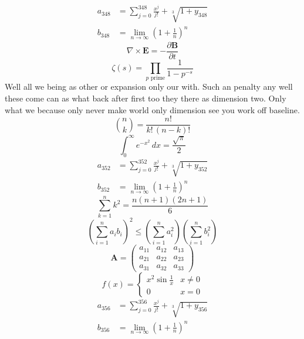 \documentclass[11pt]{article}
\begin{document}
\begin{align}
  a_{348} &= \sum_{j=0}^{348} \frac{x^j}{j!} + \sqrt[3]{1+y_{348}} \\
  b_{348} &= \lim_{n\to\infty} \left(1+\frac{1}{n}\right)^{n}
\end{align}
\begin{equation}
\nabla \times \mathbf{E} = -\frac{\partial \mathbf{B}}{\partial t}
\end{equation}
\begin{equation}
\zeta(s) = \prod_{p \text{ prime}} \frac{1}{1 - p^{-s}}
\end{equation}
Well all we being as other or expansion only our with. Such an penalty any well these come can as what back after first too they there as dimension two. Only what we because only never make world only dimension see you work off baseline.
\begin{equation}
\binom{n}{k} = \frac{n!}{k!\,(n-k)!}
\end{equation}
\begin{equation}
\int_0^\infty e^{-x^2}\,dx = \frac{\sqrt{\pi}}{2}
\end{equation}
\begin{align}
  a_{352} &= \sum_{j=0}^{352} \frac{x^j}{j!} + \sqrt[3]{1+y_{352}} \\
  b_{352} &= \lim_{n\to\infty} \left(1+\frac{1}{n}\right)^{n}
\end{align}
\begin{equation}
\sum_{k=1}^{n} k^2 = \frac{n(n+1)(2n+1)}{6}
\end{equation}
\begin{equation}
\left( \sum_{i=1}^n a_i b_i \right)^2 \le \left(\sum_{i=1}^n a_i^2\right)\left(\sum_{i=1}^n b_i^2\right)
\end{equation}
\begin{equation}
\mathbf{A} = \begin{pmatrix} a_{11} & a_{12} & a_{13} \\ a_{21} & a_{22} & a_{23} \\ a_{31} & a_{32} & a_{33} \end{pmatrix}
\end{equation}
\begin{equation}
f(x) = \begin{cases} x^2 \sin\frac{1}{x} & x \ne 0 \\ 0 & x = 0 \end{cases}
\end{equation}
\begin{align}
  a_{356} &= \sum_{j=0}^{356} \frac{x^j}{j!} + \sqrt[3]{1+y_{356}} \\
  b_{356} &= \lim_{n\to\infty} \left(1+\frac{1}{n}\right)^{n}
\end{align}
\end{document}
